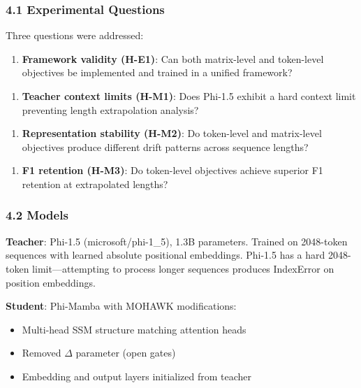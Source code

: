 
\subsubsection{4.1 Experimental Questions}

Three questions were addressed:

\begin{enumerate}
\item \textbf{Framework validity (H-E1)}: Can both matrix-level and token-level objectives be implemented and trained in a unified framework?
\end{enumerate}

\begin{enumerate}
\item \textbf{Teacher context limits (H-M1)}: Does Phi-1.5 exhibit a hard context limit preventing length extrapolation analysis?
\end{enumerate}

\begin{enumerate}
\item \textbf{Representation stability (H-M2)}: Do token-level and matrix-level objectives produce different drift patterns across sequence lengths?
\end{enumerate}

\begin{enumerate}
\item \textbf{F1 retention (H-M3)}: Do token-level objectives achieve superior F1 retention at extrapolated lengths?
\end{enumerate}

\subsubsection{4.2 Models}

\textbf{Teacher}: Phi-1.5 (microsoft/phi-1\_5), 1.3B parameters. Trained on 2048-token sequences with learned absolute positional embeddings. Phi-1.5 has a hard 2048-token limit---attempting to process longer sequences produces IndexError on position embeddings.

\textbf{Student}: Phi-Mamba with MOHAWK modifications:
\begin{itemize}
\item Multi-head SSM structure matching attention heads
\item Removed $\Delta$ parameter (open gates)
\item Embedding and output layers initialized from teacher
\end{itemize}

